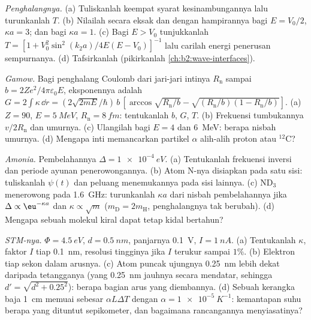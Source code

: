 \begin{exercise}[$\star\star$]\label{exo:b2:potential-wells-tunneling:8}
\emph{Penghalangnya.} (a) Tuliskanlah keempat syarat kesinambungannya lalu
turunkanlah $T$. (b) Nilailah secara eksak dan dengan hampirannya bagi $E =
V_0/2$, $\kappa a = 3$; dan bagi $\kappa a = 1$. (c) Bagi $E > V_0$ tunjukkanlah $T = [1 +
V_0^2\sin^2(k_2a)/4E(E - V_0)]^{-1}$ lalu carilah energi penerusan
sempurnanya. (d) Tafsirkanlah (pikirkanlah 
\cref{ch:b2:wave-interfaces}).
\end{exercise}

\begin{exercise}[$\star\star$]\label{exo:b2:potential-wells-tunneling:9}
\emph{Gamow.} Bagi penghalang Coulomb dari jari-jari intinya $R_{\text{n}}$
sampai $b = 2Ze^2/4\pi\varepsilon_0E$, eksponennya adalah $G = 2\int\kappa\,\dd r =
(2\sqrt{2mE}/\hbar)\,b\,[\arccos\sqrt{R_{\text{n}}/b} - \sqrt{(R_{\text{n}}/b)(1 -
R_{\text{n}}/b)}]$. (a) $Z = 90$, $E = \qty{5}{MeV}$, $R_{\text{n}} = \qty{8}{fm}$:
tentukanlah $b$, $G$, $T$. (b) Frekuensi tumbukannya $v/2R_{\text{n}}$ dan umurnya. (c)
Ulangilah bagi $E = 4$ dan \qty{6}{MeV}: berapa nisbah umurnya. (d) Mengapa
inti memancarkan partikel $\alpha$ alih-alih proton atau $^{12}$C?
\end{exercise}

\begin{exercise}[$\star\star\star$]\label{exo:b2:potential-wells-tunneling:10}
\emph{Amonia.} Pembelahannya $\Delta = \qty{1e-4}{eV}$. (a) Tentukanlah frekuensi inversi
dan periode ayunan penerowongannya. (b) Atom N-nya
disiapkan pada satu sisi: tuliskanlah $\psi(t)$ dan peluang menemukannya
pada sisi lainnya. (c) ND$_3$ menerowong pada \qty{1.6}{GHz}: turunkanlah $\kappa a$
dari nisbah pembelahannya jika $\Delta \propto \eu^{-\kappa a}$ dan $\kappa
\propto\sqrt m$ ($m_{\text{D}} = 2m_{\text{H}}$, penghalangnya tak berubah). (d) Mengapa
sebuah molekul kiral dapat tetap kidal bertahun?
\end{exercise}

\begin{exercise}[$\star\star\star$]\label{exo:b2:potential-wells-tunneling:11}
\emph{STM-nya.} $\Phi = \qty{4.5}{eV}$, $d = \qty{0.5}{nm}$, panjarnya \qty{0.1}{V},
$I = \qty{1}{nA}$. (a) Tentukanlah $\kappa$, faktor $I$ tiap \qty{0.1}{nm},
resolusi tingginya jika $I$ terukur sampai $1\%$. (b) Elektron tiap sekon
dalam arusnya. (c) Atom puncak ujungnya \qty{0.25}{nm} lebih dekat daripada
tetangganya (yang \qty{0.25}{nm} jauhnya secara mendatar, sehingga $d' = \sqrt{d^2 + 0.25^2}$):
berapa bagian arus yang diembannya. (d) Sebuah kerangka baja \qty{1}{cm} memuai
sebesar $\alpha L\Delta T$ dengan $\alpha = \qty{1e-5}{K^{-1}}$: kemantapan suhu berapa
yang dituntut sepikometer, dan bagaimana rancangannya menyiasatinya?
\end{exercise}

